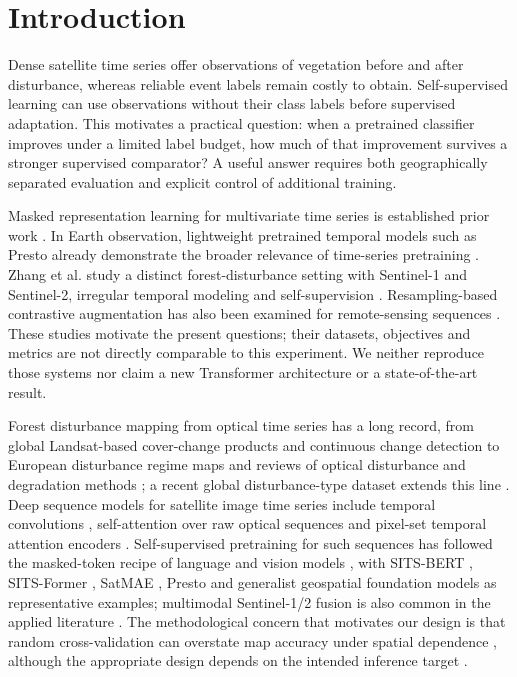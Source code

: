 \documentclass[11pt,a4paper]{article}
\begin{document}
\section{Introduction}
Dense satellite time series offer observations of vegetation before and after disturbance, whereas reliable event labels remain costly to obtain. Self-supervised learning can use observations without their class labels before supervised adaptation. This motivates a practical question: when a pretrained classifier improves under a limited label budget, how much of that improvement survives a stronger supervised comparator? A useful answer requires both geographically separated evaluation and explicit control of additional training.

Masked representation learning for multivariate time series is established prior work \cite{ref3}. In Earth observation, lightweight pretrained temporal models such as Presto already demonstrate the broader relevance of time-series pretraining \cite{ref7}. Zhang et al. study a distinct forest-disturbance setting with Sentinel-1 and Sentinel-2, irregular temporal modeling and self-supervision \cite{ref2}. Resampling-based contrastive augmentation has also been examined for remote-sensing sequences \cite{ref8}. These studies motivate the present questions; their datasets, objectives and metrics are not directly comparable to this experiment. We neither reproduce those systems nor claim a new Transformer architecture or a state-of-the-art result.

Forest disturbance mapping from optical time series has a long record, from global Landsat-based cover-change products \cite{ref17} and continuous change detection \cite{ref20} to European disturbance regime maps \cite{ref18} and reviews of optical disturbance and degradation methods \cite{ref19}; a recent global disturbance-type dataset extends this line \cite{ref24}. Deep sequence models for satellite image time series include temporal convolutions \cite{ref11}, self-attention over raw optical sequences \cite{ref12} and pixel-set temporal attention encoders \cite{ref13}. Self-supervised pretraining for such sequences has followed the masked-token recipe of language and vision models \cite{ref14}, with SITS-BERT \cite{ref9}, SITS-Former \cite{ref10}, SatMAE \cite{ref15}, Presto \cite{ref7} and generalist geospatial foundation models \cite{ref16} as representative examples; multimodal Sentinel-1/2 fusion is also common in the applied literature \cite{ref25,ref26}. The methodological concern that motivates our design is that random cross-validation can overstate map accuracy under spatial dependence \cite{ref4,ref21,ref22}, although the appropriate design depends on the intended inference target \cite{ref23}.
\end{document}
